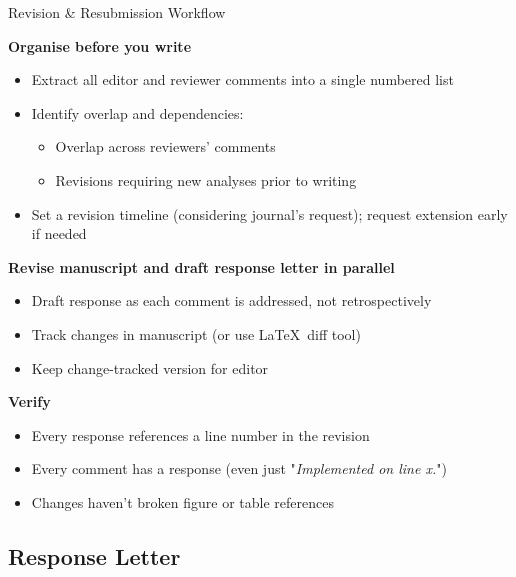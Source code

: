 \documentclass{beamer}
\begin{document}
\begin{frame}{Revision \& Resubmission Workflow}

  \footnotesize
  \textbf{Organise before you write}
  \begin{itemize}
    \item Extract all editor and reviewer comments into a
      single numbered list
    \item Identify overlap and dependencies: 
      \begin{itemize}
        \scriptsize
        \item Overlap across reviewers' comments
        \item Revisions requiring new analyses prior to writing 
      \end{itemize}
    \item Set a revision timeline (considering journal's request); 
    request extension early if needed
  \end{itemize}

  \medskip
  \textbf{Revise manuscript and draft response letter in parallel}
  \begin{itemize}
    \item Draft response as each comment is addressed, not retrospectively
    \item Track changes in manuscript (or use \LaTeX\ diff tool)
    \item Keep change-tracked version for editor
  \end{itemize}

  \medskip
  \textbf{Verify}
  \begin{itemize}
    \item Every response references a line number in the revision
    \item Every comment has a response {\scriptsize (even just "\textit{Implemented on line x.}")}
    \item Changes haven't broken figure or table references
  \end{itemize}

\end{frame}



\subsection{Response Letter}
\end{document}

